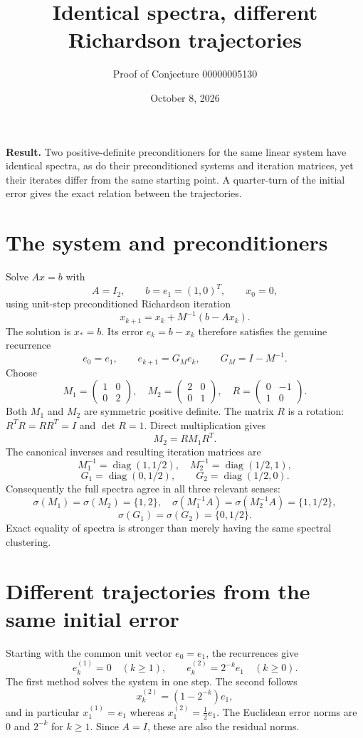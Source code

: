\documentclass[11pt]{article}
\title{Identical spectra, different Richardson trajectories}
\author{Proof of Conjecture 00000005130}
\date{October 8, 2026}
\begin{document}
\maketitle
\noindent\textbf{Result.} Two positive-definite preconditioners for the same linear system have identical spectra, as do their preconditioned systems and iteration matrices, yet their iterates differ from the same starting point. A quarter-turn of the initial error gives the exact relation between the trajectories.

\section*{The system and preconditioners}
Solve $Ax=b$ with
\[
 A=I_2,\qquad b=e_1=(1,0)^T,\qquad x_0=0,
\]
using unit-step preconditioned Richardson iteration
\[
 x_{k+1}=x_k+M^{-1}(b-Ax_k).
\]
The solution is $x_*=b$. Its error $e_k=b-x_k$ therefore satisfies the genuine recurrence
\[
 e_0=e_1,\qquad e_{k+1}=G_Me_k,\qquad G_M=I-M^{-1}.
\]
Choose
\[
 M_1=\begin{pmatrix}1&0\\0&2\end{pmatrix},\quad
 M_2=\begin{pmatrix}2&0\\0&1\end{pmatrix},\quad
 R=\begin{pmatrix}0&-1\\1&0\end{pmatrix}.
\]
Both $M_1$ and $M_2$ are symmetric positive definite. The matrix $R$ is a rotation: $R^TR=RR^T=I$ and $\det R=1$. Direct multiplication gives
\[
 M_2=RM_1R^T.
\]
The canonical inverses and resulting iteration matrices are
\[
 M_1^{-1}=\operatorname{diag}(1,1/2),\quad
 M_2^{-1}=\operatorname{diag}(1/2,1),
\]
\[
 G_1=\operatorname{diag}(0,1/2),\qquad
 G_2=\operatorname{diag}(1/2,0).
\]
Consequently the full spectra agree in all three relevant senses:
\[
 \sigma(M_1)=\sigma(M_2)=\{1,2\},\quad
 \sigma(M_1^{-1}A)=\sigma(M_2^{-1}A)=\{1,1/2\},
\]
\[
 \sigma(G_1)=\sigma(G_2)=\{0,1/2\}.
\]
Exact equality of spectra is stronger than merely having the same spectral clustering.

\newpage
\section*{Different trajectories from the same initial error}
Starting with the common unit vector $e_0=e_1$, the recurrences give
\[
 e_k^{(1)}=0\quad(k\geq1),\qquad
 e_k^{(2)}=2^{-k}e_1\quad(k\geq0).
\]
The first method solves the system in one step. The second follows
\[
 x_k^{(2)}=(1-2^{-k})e_1,
\]
and in particular $x_1^{(1)}=e_1$ whereas $x_1^{(2)}=\tfrac12e_1$. The Euclidean error norms are $0$ and $2^{-k}$ for $k\geq1$. Since $A=I$, these are also the residual norms.
\end{document}

